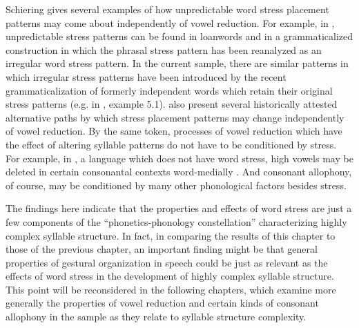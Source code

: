   Schiering gives several examples of how unpredictable word stress placement patterns may come about independently of vowel reduction. For example, in , unpredictable stress patterns can be found in loanwords and in a grammaticalized construction in which the phrasal stress pattern has been reanalyzed as an irregular word stress pattern. In the current sample, there are similar patterns in which irregular stress patterns have been introduced by the recent grammaticalization of formerly independent words which retain their original stress patterns (e.g. in , example 5.1). \citet{BybeeEtAl1998} also present several historically attested alternative paths by which stress placement patterns may change independently of vowel reduction. By the same token, processes of vowel reduction which have the effect of altering syllable patterns do not have to be conditioned by stress. For example, in , a language which does not have word stress, high vowels may be deleted in certain consonantal contexts word-medially \citep[202--205]{Taylor1985}. And consonant allophony, of course, may be conditioned by many other phonological factors besides stress.

  The findings here indicate that the properties and effects of word stress are just a few components of the “phonetics-phonology constellation” \citep[354]{Schiering2007} characterizing highly complex syllable structure. In fact, in comparing the results of this chapter to those of the previous chapter, an important finding might be that general properties of gestural organization in speech could be just as relevant as the effects of word stress in the development of highly complex syllable structure. This point will be reconsidered in the following chapters, which examine more generally the properties of vowel reduction and certain kinds of consonant allophony in the sample as they relate to syllable structure complexity.

